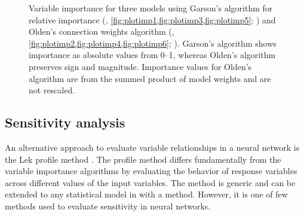 \documentclass[article]{jss}
\begin{document}
\begin{figure}[t!]
\caption{Variable importance for three models using Garson's algorithm
  for relative importance (,
  \cref{fig:plotimp1,fig:plotimp3,fig:plotimp5};
  \citealt{Garson91,Goh95}) and Olden's connection weights algorithm
  (, \cref{fig:plotimp2,fig:plotimp4,fig:plotimp6};
  \citealt{Olden04}).  Garson's algorithm shows importance as absolute
  values from 0--1, whereas Olden's algorithm preserves sign and
  magnitude.  Importance values for Olden's algorithm are from the
  summed product of model weights and are not rescaled.}
\label{fig:plotimp}
\end{figure}

\subsection{Sensitivity analysis}

An alternative approach to evaluate variable relationships in a neural
network is the Lek profile method \citep{Lek96,Gevrey03}. The profile
method differs fundamentally from the variable importance algorithms
by evaluating the behavior of response variables across different
values of the input variables. The method is generic and can be
extended to any statistical model in  with a
 method. However, it is one of few methods used to
evaluate sensitivity in neural networks.
\end{document}
